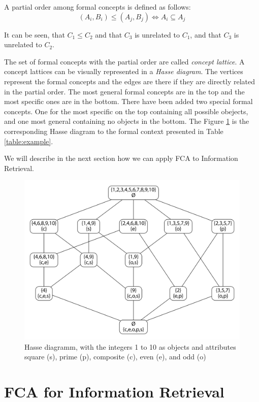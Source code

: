 \documentclass[11pt]{report}
\begin{document}
A partial order among formal concepts is defined as follows:
\begin{equation}
	(A_i,B_i) \le (A_j, B_j) \Longleftrightarrow	A_i \subseteq A_j
\end{equation} 

It can be seen, that $C_1 \le C_2$ and that $C_3$ is unrelated to $C_1$, and that $C_3$ is unrelated to $C_2$.

The set of formal concepts with the partial order are called \textit{concept lattice}. A concept lattices can be visually represented in a \textit{Hasse diagram}. The vertices represent the formal concepts and the edges are there if they are directly related in the partial order. The most general formal concepts are in the top and the most specific ones are in the bottom. There have been added two special formal concepts. One for the most specific on the top containing all possible obejects, and one most general containing no objects in the bottom. The Figure \ref{figure:example} is the corresponding Hasse diagram to the formal context presented in Table \ref{table:example}.

We will describe in the next section how we can apply FCA to Information Retrieval.


\begin{figure}[h]
\caption{Hasse diagramm, with the integers 1 to 10 as objects and attributes square (s), prime (p), composite (c), even (e), and odd (o)}
\label{figure:example}
	\centering
	\includegraphics[width=\linewidth]{fcaExample}
\end{figure}

\section{FCA for Information Retrieval}
\end{document}
